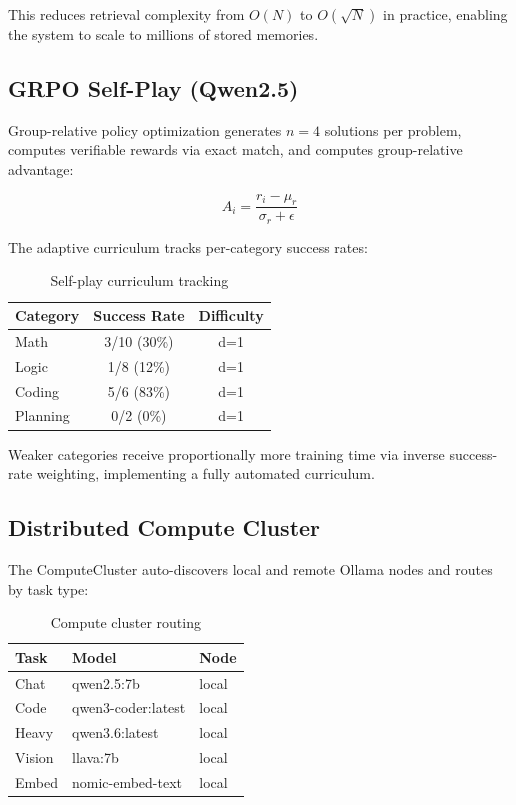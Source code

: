 \documentclass[11pt,a4paper]{article}
\begin{document}
This reduces retrieval complexity from \(O(N)\) to \(O(\sqrt{N})\) in
practice, enabling the system to scale to millions of stored memories.

\subsection{GRPO Self-Play (Qwen2.5)}

Group-relative policy optimization generates \(n=4\) solutions per problem,
computes verifiable rewards via exact match, and computes group-relative
advantage:

\begin{equation}
A_i = \frac{r_i - \mu_r}{\sigma_r + \epsilon}
\end{equation}

The adaptive curriculum tracks per-category success rates:

\begin{table}[h]
\centering
\caption{Self-play curriculum tracking}
\begin{tabular}{lcc}
\toprule
Category & Success Rate & Difficulty \\
\midrule
Math    & 3/10 (30\%)  & d=1 \\
Logic   & 1/8  (12\%)  & d=1 \\
Coding  & 5/6  (83\%)  & d=1 \\
Planning& 0/2  (0\%)   & d=1 \\
\bottomrule
\end{tabular}
\end{table}

Weaker categories receive proportionally more training time via inverse
success-rate weighting, implementing a fully automated curriculum.

\subsection{Distributed Compute Cluster}

The ComputeCluster auto-discovers local and remote Ollama nodes and routes
by task type:

\begin{table}[h]
\centering
\caption{Compute cluster routing}
\begin{tabular}{lll}
\toprule
Task & Model & Node \\
\midrule
Chat    & qwen2.5:7b       & local \\
Code    & qwen3-coder:latest & local \\
Heavy   & qwen3.6:latest   & local \\
Vision  & llava:7b         & local \\
Embed   & nomic-embed-text & local \\
\bottomrule
\end{tabular}
\end{table}
\end{document}
